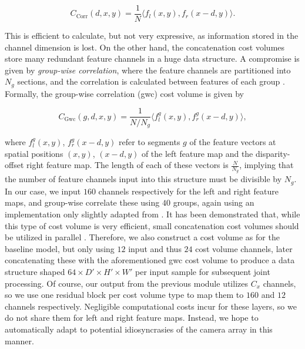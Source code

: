 \documentclass[runningheads]{llncs}
\begin{document}
\begin{equation}
   C_{\text{Corr}}(d,x,y)  = \frac{1}{N} \langle f_l(x,y), f_r(x-d,y)\rangle.
\end{equation}

This is efficient to calculate, but not very expressive, as information stored in the channel dimension is lost. On the other hand, the concatenation cost volumes store many redundant feature channels in a huge data structure. A compromise is given by \textit{group-wise correlation}, where the feature channels are partitioned into $N_g$ sections, and the correlation is calculated between features of each group \cite{guo2019groupwise}. Formally, the group-wise correlation (gwc) cost volume is given by

\begin{equation}
   C_{\text{Gwc}}(g,d,x,y)  = \frac{1}{N / N_g} \langle f_l^g(x,y), f_r^g(x-d,y)\rangle,
\end{equation}

where $f_l^g(x,y)$, $f_r^g(x-d,y)$ refer to segments $g$ of the feature vectors at spatial positions $(x,y)$, $(x-d,y)$ of the left feature map and the disparity-offset right feature map. The length of each of these vectors is $\frac{N}{N_g}$, implying that the number of feature channels input into this structure must be divisible by $N_g$. In our case, we input $160$ channels respectively for the left and right feature maps, and group-wise correlate these using $40$ groups, again using an implementation only slightly adapted from \cite{GwcGit}. It has been demonstrated that, while this type of cost volume is very efficient, small concatenation cost volumes should be utilized in parallel \cite{guo2019groupwise}. Therefore, we also construct a cost volume as for the baseline model, but only using $12$ input and thus $24$ cost volume channels, later concatenating these with the aforementioned gwc cost volume to produce a data structure shaped $64 \times D' \times H' \times W'$ per input sample for subsequent joint processing. Of course, our output from the previous module utilizes $C_x$ channels, so we use one residual block per cost volume type to map them to $160$ and $12$ channels respectively. Negligible computational costs incur for these layers, so we do not share them for left and right feature maps. Instead, we hope to automatically adapt to potential idiosyncrasies of the camera array in this manner.
\end{document}
